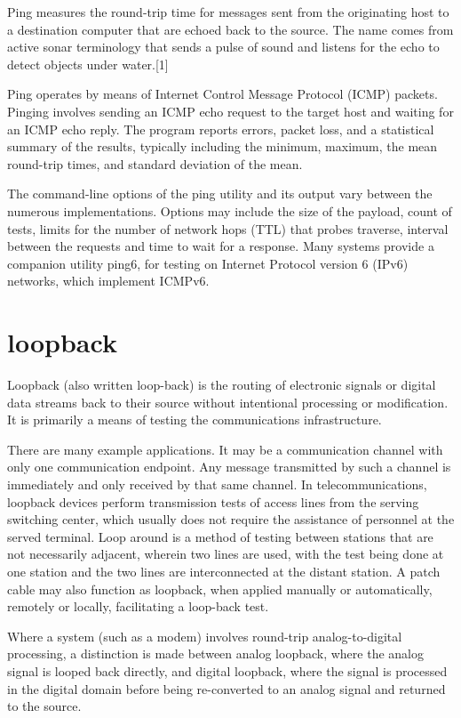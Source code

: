 \documentclass[a4paper,12pt]{article}
\begin{document}
Ping measures the round-trip time for messages sent from the originating host to a destination computer that are echoed back to the source. The name comes from active sonar terminology that sends a pulse of sound and listens for the echo to detect objects under water.[1]

Ping operates by means of Internet Control Message Protocol (ICMP) packets. Pinging involves sending an ICMP echo request to the target host and waiting for an ICMP echo reply. The program reports errors, packet loss, and a statistical summary of the results, typically including the minimum, maximum, the mean round-trip times, and standard deviation of the mean.

The command-line options of the ping utility and its output vary between the numerous implementations. Options may include the size of the payload, count of tests, limits for the number of network hops (TTL) that probes traverse, interval between the requests and time to wait for a response. Many systems provide a companion utility ping6, for testing on Internet Protocol version 6 (IPv6) networks, which implement ICMPv6.

\section{loopback}
Loopback (also written loop-back) is the routing of electronic signals or digital data streams back to their source without intentional processing or modification. It is primarily a means of testing the communications infrastructure.

There are many example applications. It may be a communication channel with only one communication endpoint. Any message transmitted by such a channel is immediately and only received by that same channel. In telecommunications, loopback devices perform transmission tests of access lines from the serving switching center, which usually does not require the assistance of personnel at the served terminal. Loop around is a method of testing between stations that are not necessarily adjacent, wherein two lines are used, with the test being done at one station and the two lines are interconnected at the distant station. A patch cable may also function as loopback, when applied manually or automatically, remotely or locally, facilitating a loop-back test.

Where a system (such as a modem) involves round-trip analog-to-digital processing, a distinction is made between analog loopback, where the analog signal is looped back directly, and digital loopback, where the signal is processed in the digital domain before being re-converted to an analog signal and returned to the source.
\end{document}
